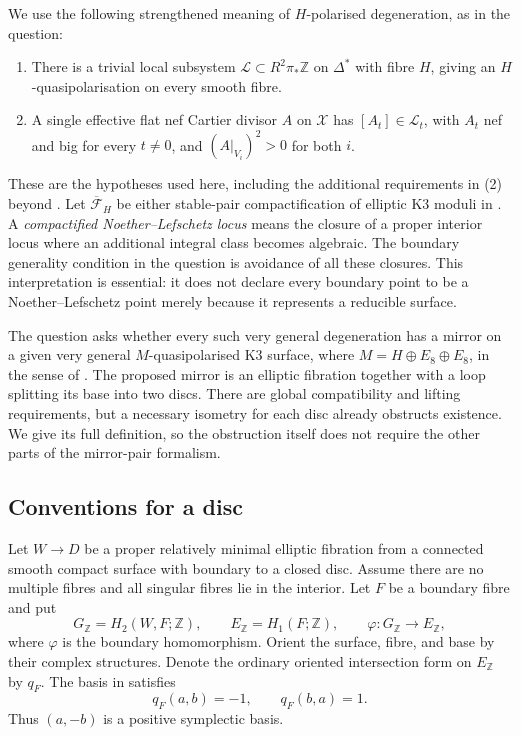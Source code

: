 \documentclass[11pt]{article}
\theoremstyle{definition}
\theoremstyle{remark}
\newcommand{\Z}{\mathbb Z}
\begin{document}
We use the following strengthened meaning of $H$-polarised degeneration, as in the question:
\begin{enumerate}
\item There is a trivial local subsystem $\mathcal L\subset R^2\pi_*\Z$ on $\Delta^*$ with fibre $H$, giving an $H$-quasipolarisation on every smooth fibre.
\item A single effective flat nef Cartier divisor $A$ on $\mathcal X$ has $[A_t]\in\mathcal L_t$, with $A_t$ nef and big for every $t\ne0$, and $(A|_{V_i})^2>0$ for both $i$.
\end{enumerate}
These are the hypotheses used here, including the additional requirements in (2) beyond \cite[Definition~3.20]{GT}. Let $\overline{\mathcal F}_H$ be either stable-pair compactification of elliptic K3 moduli in \cite{ABE}. A \emph{compactified Noether--Lefschetz locus} means the closure of a proper interior locus where an additional integral class becomes algebraic. The boundary generality condition in the question is avoidance of all these closures. This interpretation is essential: it does not declare every boundary point to be a Noether--Lefschetz point merely because it represents a reducible surface.

The question asks whether every such very general degeneration has a mirror on a given very general $M$-quasipolarised K3 surface, where $M=H\oplus E_8\oplus E_8$, in the sense of \cite[Definitions~4.11, 4.21, and~5.1]{GT}. The proposed mirror is an elliptic fibration together with a loop splitting its base into two discs. There are global compatibility and lifting requirements, but a necessary isometry for each disc already obstructs existence. We give its full definition, so the obstruction itself does not require the other parts of the mirror-pair formalism.

\subsection{Conventions for a disc}
Let $W\to D$ be a proper relatively minimal elliptic fibration from a connected smooth compact surface with boundary to a closed disc. Assume there are no multiple fibres and all singular fibres lie in the interior. Let $F$ be a boundary fibre and put
\[
G_{\Z}=H_2(W,F;\Z),\qquad E_{\Z}=H_1(F;\Z),\qquad
\varphi:G_{\Z}\longrightarrow E_{\Z},
\]
where $\varphi$ is the boundary homomorphism. Orient the surface, fibre, and base by their complex structures. Denote the ordinary oriented intersection form on $E_{\Z}$ by $q_F$. The basis in \cite[Definition~2.2]{GT} satisfies
\begin{equation}\label{eq:fibre}
q_F(a,b)=-1,\qquad q_F(b,a)=1.
\end{equation}
Thus $(a,-b)$ is a positive symplectic basis.
\end{document}
